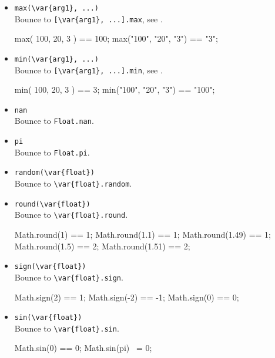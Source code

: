 \begin{itemize}
\item \lstinline|max(\var{arg1}, ...)|\\
  Bounce to \lstinline|[\var{arg1}, ...].max|, see .
\begin{urbiassert}[firstnumber=last]
max( 100,   20,   3 ) == 100;
max("100", "20", "3") == "3";
\end{urbiassert}

\item \lstinline|min(\var{arg1}, ...)|\\
  Bounce to \lstinline|[\var{arg1}, ...].min|, see .
\begin{urbiassert}[firstnumber=last]
min( 100,   20,   3 ) ==     3;
min("100", "20", "3") == "100";
\end{urbiassert}

\item \lstinline|nan|\\
  Bounce to \lstinline|Float.nan|.

\item \lstinline|pi|\\
  Bounce to \lstinline|Float.pi|.

\item \lstinline|random(\var{float})|\\
  Bounce to \lstinline|\var{float}.random|.

\item \lstinline|round(\var{float})|\\
  Bounce to \lstinline|\var{float}.round|.
\begin{urbiassert}[firstnumber=last]
Math.round(1) == 1;
Math.round(1.1) == 1;
Math.round(1.49) == 1;
Math.round(1.5) == 2;
Math.round(1.51) == 2;
\end{urbiassert}

\item \lstinline|sign(\var{float})|\\
  Bounce to \lstinline|\var{float}.sign|.
\begin{urbiassert}[firstnumber=last]
Math.sign(2)  == 1;
Math.sign(-2) == -1;
Math.sign(0)  == 0;
\end{urbiassert}

\item \lstinline|sin(\var{float})|\\
  Bounce to \lstinline|\var{float}.sin|.
\begin{urbiassert}[firstnumber=last]
Math.sin(0) == 0;
Math.sin(pi) ~= 0;
\end{urbiassert}


\end{itemize}
